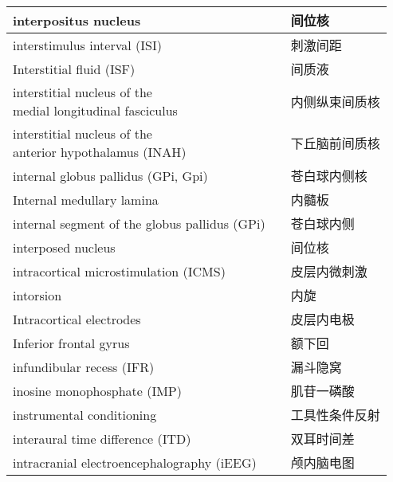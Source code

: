 \begin{longtable}{lll}
	\midrule
	interpositus nucleus  && 间位核  \\
	
	\midrule
	interstimulus interval (ISI)  && 刺激间距  \\
	
	\midrule
	Interstitial fluid (ISF)  && 间质液  \\
	
	\midrule
	\makecell[l]{interstitial nucleus of the \\medial longitudinal fasciculus}   && 内侧纵束间质核  \\
	
	\midrule
	\makecell[l]{interstitial nucleus of the \\anterior hypothalamus  (INAH)} && 下丘脑前间质核  \\
	
	\midrule
	internal globus pallidus (GPi, Gpi)  && 苍白球内侧核  \\
	
	\midrule
	Internal medullary lamina  && 内髓板  \\
	
	\midrule
	internal segment of the globus pallidus (GPi) && 苍白球内侧  \\
	
	\midrule
	interposed nucleus && 间位核  \\
	
	\midrule
	intracortical microstimulation (ICMS)  && 皮层内微刺激  \\
	
	\midrule
	intorsion   && 内旋  \\
	
	\midrule
	Intracortical electrodes   && 皮层内电极  \\
	
	\midrule
	Inferior frontal gyrus   && 额下回  \\
	
	\midrule
	infundibular recess (IFR)   && 漏斗隐窝  \\
	
	\midrule
	inosine monophosphate (IMP)  && 肌苷一磷酸  \\
	
	\midrule
	instrumental conditioning  && 工具性条件反射  \\
	
	\midrule
	interaural time difference (ITD)   && 双耳时间差  \\
	
	\midrule
	intracranial electroencephalography (iEEG)  && 颅内脑电图  \\
	

\end{longtable}
